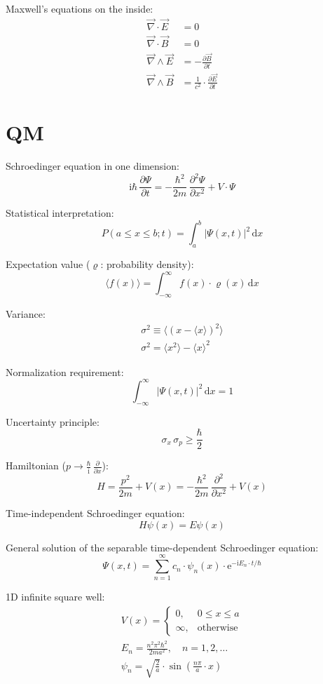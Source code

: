 \documentclass[fontsize=11pt,a4paper]{scrartcl}
\begin{document}
Maxwell's equations on the inside:
\begin{align*}
	\vec\nabla\cdot\vec E&=0\\
	\vec\nabla\cdot\vec B&=0\\
	\vec\nabla\wedge\vec E&=-\frac{\partial\vec B}{\partial t}\\
	\vec\nabla\wedge\vec B&=\frac{1}{c^2}\cdot\frac{\partial\vec E}{\partial t}
\end{align*}
%
%
%
%
%
\section{QM}
Schroedinger equation in one dimension:
\[
	\mathrm{i}\hbar\,\frac{\partial\Psi}{\partial t}=-\frac{\hbar^2}{2m}\,\frac{\partial^2\Psi}{\partial x^2}+V\cdot\Psi
\]

Statistical interpretation:
\[
	P(a\le x\le b; t)=\int_a^b |\Psi(x,t)|^2\,\mathrm{d}x
\]

Expectation value ($\varrho$: probability density):
\[
	\langle f(x)\rangle=\int_{-\infty}^\infty f(x)\cdot\varrho(x)\,\mathrm{d}x
\]

Variance:
\begin{gather*}
	\sigma^2\equiv\langle\left(x-\langle x\rangle\right)^2\rangle\\
	\sigma^2=\langle x^2\rangle - \langle x\rangle^2
\end{gather*}

Normalization requirement:
\[
	\int_{-\infty}^\infty |\Psi(x,t)|^2\,\mathrm{d}x = 1
\]

Uncertainty principle:
\[
	\sigma_x\,\sigma_p\ge\frac{\hbar}{2}
\]

Hamiltonian ($p\to\frac{\hbar}{\mathrm{i}}\,\frac{\partial}{\partial x}$):
\[
	H=\frac{p^2}{2m}+V(x)=-\frac{\hbar^2}{2m}\,\frac{\partial^2}{\partial x^2}+V(x)
\]

Time-independent Schroedinger equation:
\[
	H\psi(x)=E\psi(x)
\]

General solution of the separable time-dependent Schroedinger equation:
\[
	\Psi(x,t)=\sum_{n=1}^\infty c_n\cdot\psi_n(x)\cdot\mathrm{e}^{-\mathrm{i} E_n\cdot t/\hbar}
\]

1D infinite square well:
\begin{gather*}
	V(x)=\begin{cases}
		0, & 0\le x\le a\\
		\infty, & \text{otherwise}
	\end{cases}\\
	E_n = \frac{n^2\pi^2\hbar^2}{2ma^2}, \quad n=1,2,\dots\\
	\psi_n = \sqrt{\frac{2}{a}}\cdot\sin\left(\frac{n\pi}{a}\cdot x\right)
\end{gather*}
\end{document}
